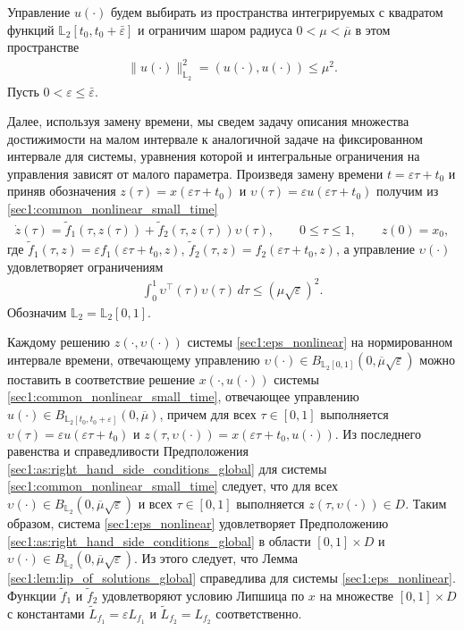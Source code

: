 \documentclass[../main.tex]{subfiles}
\begin{document}
Управление $u(\cdot)$ будем выбирать из пространства интегрируемых с квадратом функций $\mathbb{L}_2[t_0,t_0+\bar{\varepsilon}]$ и ограничим шаром радиуса $  0 < \mu < \overline{\mu} $ в этом пространстве
\begin{gather*}
    \lVert u(\cdot)\rVert^2_{\mathbb{L}_2} = \left(u(\cdot),u(\cdot) \right) \leqslant \mu^2.
\end{gather*}
Пусть $ 0 <  \varepsilon \leqslant \bar{\varepsilon} $.
 
    
Далее, используя замену времени, мы сведем задачу описания множества достижимости на малом интервале к аналогичной задаче на фиксированном интервале для системы, уравнения которой и интегральные ограничения на управления зависят от малого параметра.
Произведя замену времени $ t = \varepsilon \tau + t_0 $ и приняв обозначения $ z(\tau) = x(\varepsilon \tau + t_0) $ и $ \upsilon(\tau) = \varepsilon u(\varepsilon \tau + t_0) $  получим из \eqref{sec1:common_nonlinear_small_time}
\begin{gather}\label{sec1:eps_nonlinear}
    \dot{z}(\tau)=\widetilde{f}_1(\tau,z(\tau))+\widetilde{f}_2(\tau,z(\tau))\upsilon(\tau), \qquad 0 \leqslant \tau \leqslant 1, \qquad z(0) = x_0,
\end{gather}
где $ \widetilde{f}_1(\tau,z) = \varepsilon f_1(\varepsilon \tau + t_0,z) $, $ \widetilde{f}_2 (\tau,z) = f_2(\varepsilon \tau + t_0,z)$, а управление $ \upsilon(\cdot) $ удовлетворяет ограничениям
\begin{gather}\label{sec1:eps_control_constaint}
    \int_0^1 \upsilon^{\top}(\tau) \upsilon(\tau) \, d\tau \leqslant \left( \mu \sqrt{\varepsilon}\right)^2.
\end{gather}
Обозначим $\mathbb{L}_2 = \mathbb{L}_2[0, 1]$. 

Каждому решению $z(\cdot, \upsilon(\cdot))$ системы \eqref{sec1:eps_nonlinear} на нормированном интервале времени, отвечающему управлению $\upsilon(\cdot) \in B_{\mathbb{L}_2[0, 1]} (0, \overline{\mu} \sqrt{\varepsilon})$ можно поставить в соответствие решение $x(\cdot, u(\cdot))$ системы \eqref{sec1:common_nonlinear_small_time}, отвечающее управлению $u(\cdot) \in B_{\mathbb{L}_2[t_0, t_0 + \varepsilon]} (0, \overline{\mu})$, причем для всех $\tau \in [0, 1] $ выполняется $ \upsilon(\tau) = \varepsilon u(\varepsilon \tau + t_0)$ и $ z(\tau, \upsilon(\cdot)) = x(\varepsilon \tau + t_0, u(\cdot)) $.
Из последнего равенства и справедливости Предположения \ref{sec1:as:right_hand_side_conditions_global} для системы \eqref{sec1:common_nonlinear_small_time} следует, что для всех  $\upsilon(\cdot) \in B_{\mathbb{L}_2}(0, \overline{\mu}\sqrt{\varepsilon})$ и всех $\tau \in [0, 1] $ выполняется $z(\tau, \upsilon(\cdot)) \in D$. 
Таким образом, система \eqref{sec1:eps_nonlinear}  удовлетворяет Предположению  \ref{sec1:as:right_hand_side_conditions_global} в области $[0, 1]\times D$ и $\upsilon(\cdot) \in B_{\mathbb{L}_2}(0, \overline{\mu}\sqrt{\varepsilon}) $.
Из этого следует, что Лемма \ref{sec1:lem:lip_of_solutions_global} справедлива для системы  \eqref{sec1:eps_nonlinear}.
Функции  $\widetilde{f}_1$ и $\widetilde{f}_2$ удовлетворяют условию Липшица по $x$ на множестве $[0, 1]\times D$ с константами $\widetilde{L}_{f_1} = \varepsilon L_{f_1} $ и  $\widetilde{L}_{f_2} = L_{f_2} $ соответственно. 
    
\end{document}
